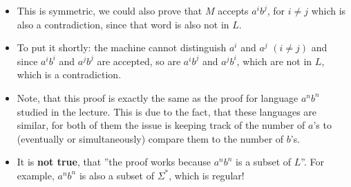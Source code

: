 \begin{itemize}
    \item This is symmetric, we could also prove that $M$ accepts $a^ib^j$, for $i\neq{}j$ which is also a contradiction, since that word is also not in $L$.
    \item To put it shortly: the machine cannot distinguish $a^i$ and $a^j$ $(i\neq{}j)$ and since $a^ib^i$ and $a^jb^j$ are accepted, so are $a^ib^j$ and $a^jb^i$, which are not in $L$, which is a contradiction.
    \item Note, that this proof is exactly the same as the proof for language $a^nb^n$ studied in the lecture. This is due to the fact, that these languages are similar, for both of them the issue is keeping track of the number of $a$'s to (eventually or simultaneously) compare them to the number of $b$'s.
    \item It is \textbf{not true}, that ''the proof works because $a^nb^n$ is a subset of $L$''. For example, $a^nb^n$ is also a subset of $\Sigma^*$, which is regular!
\end{itemize}
